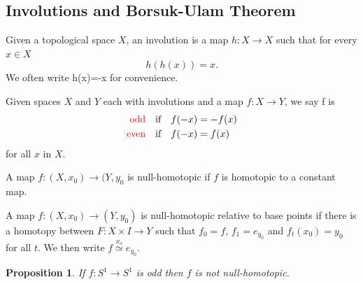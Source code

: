 \documentclass[11pt]{article}
\newcommand{\homrelset}[1]{\stackrel{#1}{\simeq}}
\newenvironment{defin}
	{\begin{mdframed}[backgroundcolor=white, roundcorner=5pt, linewidth=1pt]
		\setlength{\parindent}{0pt}
		}
	{\end{mdframed}}
\newcommand{\mdf}[1]{{\color{red} #1}}
\newtheorem{prop}[theorem]{Proposition}
\begin{document}
\subsection{Involutions and Borsuk-Ulam Theorem}
\begin{defin}
	Given a topological space $X$, an \mdf{involution} is a map $h:X\to X$ such that for every $x\in X$
	\[
		h(h(x))=x.
	\]
	We often write h(x)=-x for convenience.

	Given spaces $X$ and $Y$ each with involutions and a map $f:X\to Y$, we say f is
	\begin{align*}
		\mdf{\text{odd}}\quad&\text{if}\quad f(-x)=-f(x) \\
		\mdf{\text{even}}\quad&\text{if}\quad f(-x)=f(x)
	\end{align*}
	for all $x$ in $X$.

	A map $f:(X,x_0)\to (Y,y_0$ is \mdf{null-homotopic} if $f$ is homotopic to a constant map.

	A map $f:(X,x_0)\to (Y,y_0)$ is \mdf{null-homotopic relative to base points} if there is a homotopy between $F:X\times I \to Y$ such that $f_0=f$, $f_1=e_{y_0}$ and $f_t(x_0)=y_0$ for all $t$.
	We then write $f\homrelset{x_o} e_{y_0}$.
\end{defin}
\begin{prop}
If $f:S^1 \to S^1$ is odd then $f$ is not null-homotopic.
\end{prop}
\end{document}
